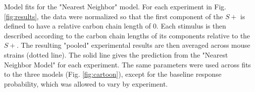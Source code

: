 \label{fig:model_fits}
Model fits for the "Nearest Neighbor" model.  For each experiment in Fig. \ref{fig:results}, the data were normalized so that the first component of the $S+$ is defined to have a relative carbon chain length of 0.  Each stimulus is then described according to the carbon chain lengths of its components relative to the $S+$.  The resulting "pooled" experimental results are then averaged across mouse strains (dotted line). The solid line gives the prediction from the "Nearest Neighbor Model" for each experiment.  The same parameters were used across fits to the three models (Fig. \ref{fig:cartoon}), except for the baseline response probability, which was allowed to vary by experiment.   